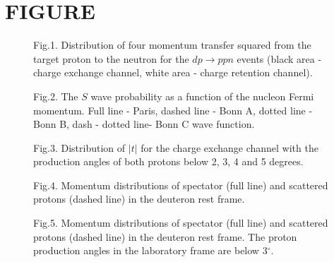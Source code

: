 \section{FIGURE}
\begin{figure}[hbt]
\begin{center}
\mbox{}
\end{center}
\vspace{0.4 mm}
Fig.1. Distribution of four momentum transfer squared from the target
proton to the neutron for the $dp\to ppn$ events (black area - charge exchange
channel, white area - charge retention channel).
\end{figure}
\begin{figure}[hbt]
\begin{center}
\mbox{}
\end{center}
\vspace{0.4mm}
Fig.2. The $S$ wave probability as a function of the nucleon Fermi momentum.
Full line - Paris, dashed line - Bonn A, dotted line - Bonn B, dash - dotted line-
Bonn C wave function.
\end{figure}
\begin{figure}[hbt]
\begin{center}
\mbox{}
\end{center}
\vspace{0.4mm}
Fig.3. Distribution of $\vert t \vert$ for the charge exchange channel with
the production angles of both protons below 2, 3, 4 and 5 degrees.
\end{figure}
\begin{figure}[hbt]
\begin{center}
\mbox{}
\end{center}
\vspace{0.4mm}
Fig.4. Momentum distributions of  spectator (full line) and
 scattered protons (dashed line) in the deuteron rest frame.
\end{figure}
\begin{figure}[hbt]
\begin{center}
\mbox{}
\end{center}
\vspace{0.4mm}
Fig.5. Momentum distributions of  spectator (full line) and  scattered
protons (dashed line) in the deuteron rest frame. The proton production angles
 in the laboratory frame are below 3$^{\circ}$.
\end{figure}
